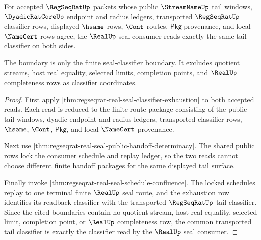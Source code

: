 \begin{theorem}
\label{thm:regseqrat-real-tail-classifier-seal}
For accepted $\RegSeqRatUp$ packets whose public $\StreamNameUp$ tail
windows, $\DyadicRatCoreUp$ endpoint and radius ledgers, transported
$\RegSeqRatUp$ classifier rows, displayed $\hsame$ rows, $\Cont$ routes,
$\mathsf{Pkg}$ provenance, and local $\NameCert$ rows agree, the $\RealUp$
seal consumer reads exactly the same tail classifier on both sides.

The boundary is only the finite seal-classifier boundary. It excludes
quotient streams, host real equality, selected limits, completion points, and
$\RealUp$ completeness rows as classifier coordinates.
\end{theorem}
\begin{proof}
First apply \autoref{thm:regseqrat-real-seal-classifier-exhaustion} to both
accepted reads. Each read is reduced to the finite route package consisting
of the public tail windows, dyadic endpoint and radius ledgers, transported
classifier rows, $\hsame$, $\Cont$, $\mathsf{Pkg}$, and local $\NameCert$
provenance.

Next use
\autoref{thm:regseqrat-real-seal-public-handoff-determinacy}. The shared
public rows lock the consumer schedule and replay ledger, so the two reads
cannot choose different finite handoff packages for the same displayed tail
surface.

Finally invoke \autoref{thm:regseqrat-real-seal-schedule-confluence}. The
locked schedules replay to one terminal finite $\RealUp$ seal route, and the
exhaustion row identifies its readback classifier with the transported
$\RegSeqRatUp$ tail classifier. Since the cited boundaries contain no
quotient stream, host real equality, selected limit, completion point, or
$\RealUp$ completeness row, the common transported tail classifier is exactly
the classifier read by the $\RealUp$ seal consumer.
\end{proof}

